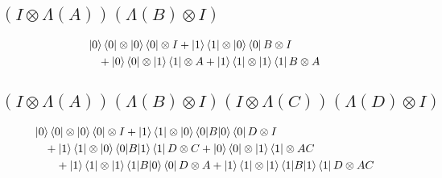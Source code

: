 \documentclass[b5paper,fleqn]{ltjsarticle}
\newcommand\al[1]{\begin{align*}#1\end{align*}}
\begin{document}
\subsection{$(I\otimes\Lambda(A))(\Lambda(B)\otimes I)$}
\noindent\ignorespaces
\al{&\ket{0}\bra{0}\otimes\ket{0}\bra{0}\otimes I+\ket{1}\bra{1}\otimes\ket{0}\bra{0}B\otimes I\\
&\quad+\ket{0}\bra{0}\otimes\ket{1}\bra{1}\otimes A+\ket{1}\bra{1}\otimes\ket{1}\bra{1}B\otimes A
}
\subsection{$(I\otimes\Lambda(A))(\Lambda(B)\otimes I)(I\otimes\Lambda(C))(\Lambda(D)\otimes I)$}
\noindent\ignorespaces
\al{&\ket{0}\bra{0}\otimes\ket{0}\bra{0}\otimes I+\ket{1}\bra{1}\otimes\ket{0}\braket{0|B|0}\bra{0}D\otimes I\\
&\quad+\ket{1}\bra{1}\otimes\ket{0}\braket{0|B|1}\bra{1}D\otimes C+\ket{0}\bra{0}\otimes\ket{1}\bra{1}\otimes AC\\
&\qquad+\ket{1}\bra{1}\otimes\ket{1}\braket{1|B|0}\bra{0}D\otimes A
+\ket{1}\bra{1}\otimes\ket{1}\braket{1|B|1}\bra{1}D\otimes AC\\
}
\end{document}
